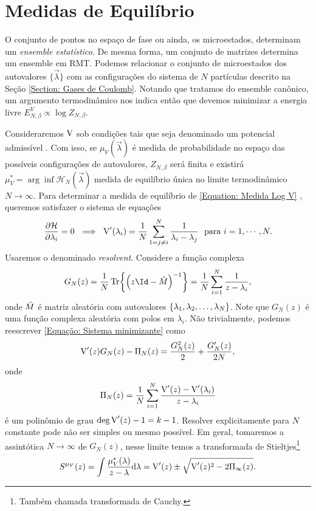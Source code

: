 \section{Medidas de Equilíbrio}
\label{Seção: Medida}
O conjunto de pontos no espaço de fase ou ainda, os microestados, determinam um \textit{ensemble estatístico}. De mesma forma, um conjunto de matrizes determina um ensemble em RMT. Podemos relacionar o conjunto de microestados dos autovalores $\{\vec{\lambda}\}$ com as configurações do sistema de $N$ partículas descrito na Seção \ref{Section: Gases de Coulomb}. Notando que tratamos do ensemble canônico, um argumento termodinâmico nos indica então que devemos minimizar a energia livre $E^V_{N,\beta} \propto \log{Z_{N, \beta}}.$

Consideraremos $\operatorname{V}$ sob condições tais que seja denominado um potencial admissível \cite{ChafaCoulombMeasure}. Com isso, se $\mu_{V}(\vec{\lambda})$ é medida de probabilidade no espaço das possíveis configurações de autovalores, $Z_{N, \beta}$ será finita e existirá $\mu_{V}^* = \arg \inf {\mathcal{H}_N(\vec{\lambda})}$ medida de equilíbrio única no limite termodinâmico $N \rightarrow \infty$. Para determinar a medida de equilíbrio de \ref{Equation: Medida Log V} \cite{RMT-firstcourse-Potters}, queremos satisfazer o sistema de equações
\begin{equation}
	\frac{\partial \mathcal{H}}{\partial \lambda_i} = 0 \ \implies \ \operatorname{V}'(\lambda_i) = \frac{1}{N} \sum_{1 = j \neq i}^{N} \frac{1}{\lambda_i - \lambda_j} \ \ \text{para} \ i = 1, \cdots, N.
	\label{Equação: Sistema minimizante}
\end{equation} 
Usaremos o denominado \textit{resolvent}. Considere a função complexa $$G_N(z) = \frac{1}{N} \Tr{\left(z\Id - \matriz{M}\right)^{-1}} = \frac{1}{N} \sum_{i=1}^{N} \frac{1}{z - \lambda_i},$$ onde $\hat M$ é matriz aleatória com autovalores $\{\lambda_1, \lambda_2, \dots, \lambda_N\}$. Note que $G_N(z)$ é uma função complexa aleatória com polos em $\lambda_i$. Não trivialmente, podemos reescrever \ref{Equação: Sistema minimizante} como $$\operatorname{V}'(z) G_N(z) - \Pi_N(z) = \frac{G_N^2(z)}{2} + \frac{G'_N(z)}{2N},$$ onde $$\Pi_N(z) = \frac{1}{N} \sum_{i = 1}^{N} \frac{\operatorname{V}'(z) - \operatorname{V}'(\lambda_i)}{z - \lambda_i}$$ é um polinômio de grau $\deg{\operatorname{V}'(z)} - 1 = k - 1$. Resolver explicitamente para $N$ constante pode não ser simples ou mesmo possível. Em geral, tomaremos a assintótica $N \to \infty$ de $G_N(z)$, nesse limite temos a transformada de Stieltjes\footnote{Também chamada transformada de Cauchy.}
\begin{equation}
	S^{\mu_V}(z) = \int \frac{\mu^*_V(\lambda)}{z - \lambda} \dd \lambda= \operatorname{V}'(z) \pm \sqrt{\operatorname{V}'(z)^2 - 2 \Pi_{\infty}(z) }.
	\label{Equation: Resolvent}
\end{equation}
